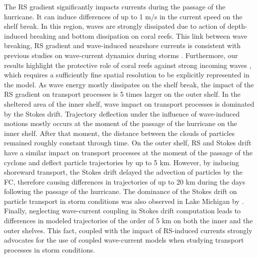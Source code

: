 The RS gradient significantly impacts currents during the passage of the hurricane. It can induce differences of up to 1 m/s in the current speed on the shelf break. In this region, waves are strongly dissipated due to action of depth-induced breaking and bottom dissipation on coral reefs. This link between wave breaking, RS gradient and wave-induced nearshore currents is consistent with previous studies on wave-current dynamics during storms \citep{mao2017dynamics,mao2018wave,mao2020particle}. Furthermore, our results highlight the protective role of coral reefs against strong incoming waves \citep{lowe2005spectral}, which requires a sufficiently fine spatial resolution to be explicitly represented in the model. As wave energy mostly dissipates on the shelf break, the impact of the RS gradient on transport processes is 5 times larger on the outer shelf. In the sheltered area of the inner shelf, wave impact on transport processes is dominated by the Stokes drift. Trajectory deflection under the influence of wave-induced motions mostly occurs at the moment of the passage of the hurricane on the inner shelf. After that moment, the distance between the clouds of particles remained roughly constant through time. On the outer shelf, RS and Stokes drift have a similar impact on transport processes at the moment of the passage of the cyclone and deflect particle trajectories by up to 5 km. However, by inducing shoreward transport, the Stokes drift delayed the advection of particles by the FC, therefore causing differences in trajectories of up to 20 km during the days following the passage of the hurricane. The dominance of the Stokes drift on particle transport in storm conditions was also observed in Lake Michigan by \cite{mao2020particle}. Finally, neglecting wave-current coupling in Stokes drift computation leads to differences in modeled trajectories of the order of 5 km on both the inner and the outer shelves. This fact, coupled with the impact of RS-induced currents strongly advocates for the use of coupled wave-current models when studying transport processes in storm conditions.


